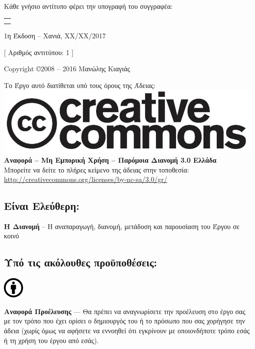 %
%
\maketitle
\begin{center}
Κάθε γνήσιο αντίτυπο φέρει την υπογραφή του συγγραφέα:
\begin{tabular}{p{}}
\\
\\
\\
\end{tabular}

\bigskip
1η Έκδοση -- Χανιά, XX/XX/2017

[ Αριθμός αντιτύπου: 1 ]

\bigskip
Copyright \copyright 2008 -- 2016 Μανώλης Κιαγιάς

Το Έργο αυτό διατίθεται υπό τους όρους της Άδειας:\\
\includegraphics[scale=0.2]{images/license/cc-logo}\\
\textbf{Αναφορά -- Μη Εμπορική Χρήση --  Παρόμοια Διανομή 3.0 Ελλάδα}\\
Μπορείτε να δείτε το πλήρες κείμενο της άδειας στην τοποθεσία:\\
\url{http://creativecommons.org/licenses/by-nc-sa/3.0/gr/}
\end{center}
\subsection*{Είναι Ελεύθερη:}

\noindent
\textbf{Η Διανομή} -- Η αναπαραγωγή, διανομή, μετάδοση και παρουσίαση του Έργου σε κοινό

\subsection*{Υπό τις ακόλουθες προϋποθέσεις:}

\vspace{1em}
\noindent
\parbox{1.5cm}{\includegraphics[scale=0.15]{images/license/cc_by_30}}
\parbox{10.5cm}{\textbf{Αναφορά Προέλευσης} — Θα πρέπει να αναγνωρίσετε την προέλευση στο έργο σας με τον τρόπο που έχει ορίσει ο δημιουργός του ή το πρόσωπο που σας χορήγησε την άδεια (χωρίς όμως να αφήσετε να εννοηθεί  ότι εγκρίνουν  με οποιονδήποτε τρόπο εσάς ή τη χρήση του έργου από εσάς).}

